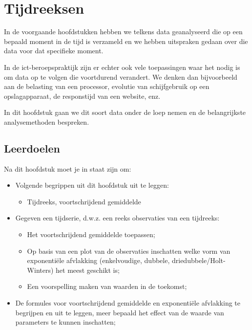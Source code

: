 \chapter{Tijdreeksen}
\label{ch:tijdreeksen}

In de voorgaande hoofdstukken hebben we telkens data geanalyseerd die op een bepaald moment in de tijd is verzameld en we hebben uitspraken gedaan over die data voor dat specifieke moment.

In de ict-beroepspraktijk zijn er echter ook vele toepassingen waar het nodig is om data op te volgen die voortdurend verandert. We denken dan bijvoorbeeld aan de belasting van een processor, evolutie van schijfgebruik op een opslagapparaat, de responstijd van een website, enz.

In dit hoofdstuk gaan we dit soort data onder de loep nemen en de belangrijkste analysemethoden bespreken.

\section{Leerdoelen}
\label{sec:tijdreeksen-leerdoelen}

Na dit hoofdstuk moet je in staat zijn om:

\begin{itemize}
  \item Volgende begrippen uit dit hoofdstuk uit te leggen:
  \begin{itemize}
    \item Tijdreeks, voortschrijdend gemiddelde
  \end{itemize}
  \item Gegeven een tijdserie, d.w.z. een reeks observaties van een tijdreeks:
  \begin{itemize}
    \item Het voortschrijdend gemiddelde toepassen;
    \item Op basis van een plot van de observaties inschatten welke vorm van exponentiële afvlakking (enkelvoudige, dubbele, driedubbele/Holt-Winters) het meest geschikt is;
    \item Een voorspelling maken van waarden in de toekomst;
  \end{itemize}
  \item De formules voor voortschrijdend gemiddelde en exponentiële afvlakking te begrijpen en uit te leggen, meer bepaald het effect van de waarde van parameters te kunnen inschatten;
\end{itemize}

